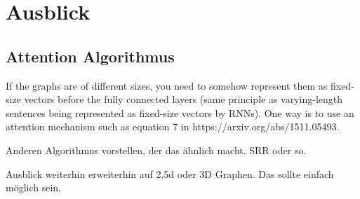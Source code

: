 \chapter{Ausblick}

\section{Attention Algorithmus}

If the graphs are of different sizes, you need to somehow represent them as fixed-size vectors before the fully connected layers (same principle as varying-length sentences being represented as fixed-size vectors by RNNs).
One way is to use an attention mechanism such as equation 7 in https://arxiv.org/abs/1511.05493.

Anderen Algorithmus vorstellen, der das ähnlich macht. SRR oder so.

Ausblick weiterhin erweiterhin auf 2,5d oder 3D Graphen.
Das sollte einfach möglich sein.
